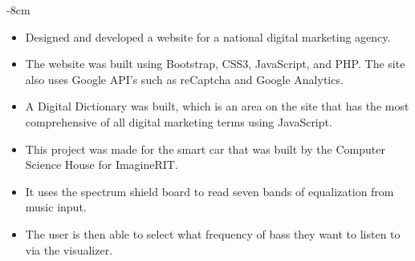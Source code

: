 \documentclass[10pt,a4paper,ragged2e]{altacv}
\begin{document}



\begin{adjustwidth}{}{-8cm}
\makecvheader
\end{adjustwidth}




\begin{itemize}
\item  Designed and developed a website for a national digital marketing agency.
\item The website was built using Bootstrap, CSS3, JavaScript, and PHP.  The site also uses Google API's such as reCaptcha and Google Analytics.
\item A Digital Dictionary was built, which is an area on the site that has the most comprehensive of all digital marketing terms using JavaScript.

\end{itemize}



\begin{itemize}
\item This project was made for the smart car that was built by the Computer Science House for ImagineRIT.
\item It uses the spectrum shield board to read seven bands of equalization from music input.
\item The user is then able to select what frequency of bass they want to listen to via the visualizer.
\end{itemize}
\divider
\end{document}
